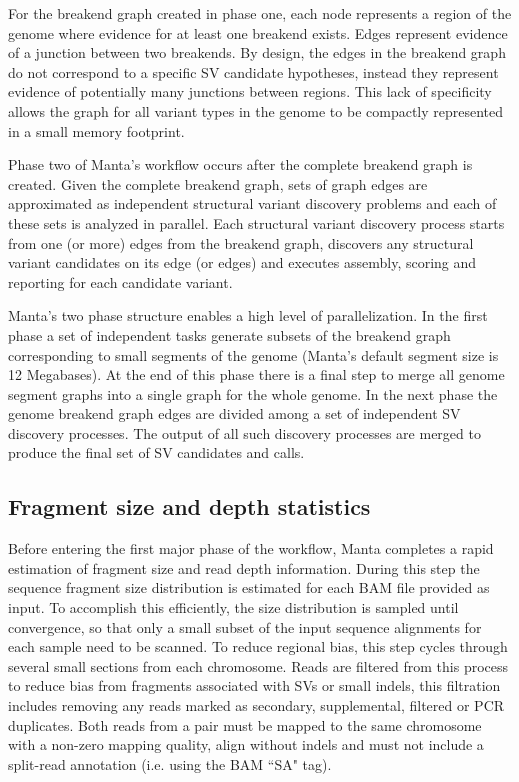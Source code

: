 \documentclass{article}
\begin{document}
For the breakend graph created in phase one, each node represents a region of the genome where evidence for at least one breakend exists. Edges represent evidence of a junction between two breakends. By design, the edges in the breakend graph do not correspond to a specific SV candidate hypotheses, instead they represent evidence of potentially many junctions between regions. This lack of specificity allows the graph for all variant types in the genome to be compactly represented in a small memory footprint.

Phase two of Manta's workflow occurs after the complete breakend graph is created. Given the complete breakend graph, sets of graph edges are approximated as independent structural variant discovery problems and each of these sets is analyzed in parallel. Each structural variant discovery process starts from one (or more) edges from the breakend graph, discovers any structural variant candidates on its edge (or edges) and executes assembly, scoring and reporting for each candidate variant.

Manta's two phase structure enables a high level of parallelization. In the first phase a set of independent tasks generate subsets of the breakend graph corresponding to small segments of the genome (Manta's default segment size is 12 Megabases). At the end of this phase there is a final step to merge all genome segment graphs into a single graph for the whole genome. In the next phase the genome breakend graph edges are divided among a set of independent SV discovery processes. The output of all such discovery processes are merged to produce the final set of SV candidates and calls.

\subsection{Fragment size and depth statistics}

Before entering the first major phase of the workflow, Manta completes a rapid estimation of fragment size and read depth information. During this step the sequence fragment size distribution is estimated for each BAM file provided as input. To accomplish this efficiently, the size distribution is sampled until convergence, so that only a small subset of the input sequence alignments for each sample need to be scanned. To reduce regional bias, this step cycles through several small sections from each chromosome. Reads are filtered from this process to reduce bias from fragments associated with SVs or small indels, this filtration includes removing any reads marked as secondary, supplemental, filtered or PCR duplicates. Both reads from a pair must be mapped to the same chromosome with a non-zero mapping quality, align without indels and must not include a split-read annotation (i.e. using the BAM ``SA" tag).
\end{document}
